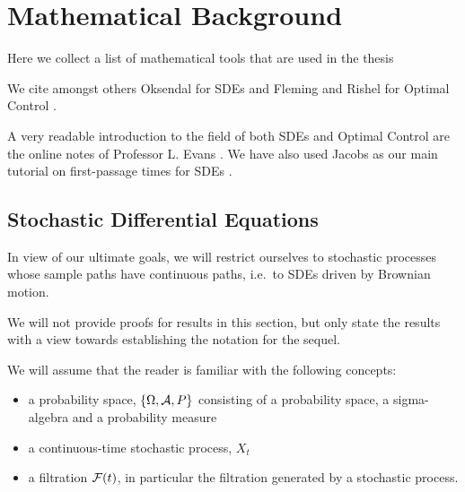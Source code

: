 \chapter{Mathematical Background}
\label{ch:math_background}

Here we collect a list of mathematical tools that are used in the thesis

We cite amongst others Oksendal for SDEs \cite{Oksendal2007} and Fleming and
Rishel for Optimal Control \cite{Fleming1975}.

A very readable introduction to the field of both SDEs and Optimal Control are
the online notes of Professor L. Evans \cite{Evansa,Evansb}. We have also used
Jacobs as our main tutorial on first-passage times for SDEs \cite{Jacobs}. 
 
\section{Stochastic Differential Equations}
\label{sec:SDEs}
In view of our ultimate goals, we will restrict ourselves to  stochastic
processes whose sample paths have continuous paths, i.e.\ to SDEs driven by
Brownian motion.  

We will not provide proofs for results in this section, but only state the
results with a view towards establishing the notation for the sequel.

We will assume that the reader is familiar with the following concepts:
\begin{itemize} 
  \item a probability space, $\{{\Omega}, { \mathcal{A} }, P\}$ consisting of a
  probability space, a sigma-algebra and a probability measure
  \item a continuous-time stochastic process, $X_t$
  \item a filtration ${\mathcal{F}}(t)$, in particular the filtration generated by a
  stochastic process.
\end{itemize}

